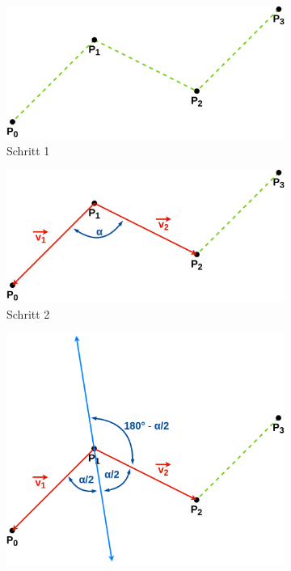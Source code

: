 \documentclass[doktyp=studarbeit]{TUBAFarbeiten}
\begin{document}
\begin{figure}[!htb]
    \centering
    \begin{subfigure}[b]{0.45\textwidth}
        \centering
        \includegraphics[width=1\linewidth]{Schlangenlinie-1.png}
        \caption{Schritt 1}
    \end{subfigure}
    \qquad
    \begin{subfigure}[b]{0.45\textwidth}
        \centering
        \includegraphics[width=1\linewidth]{Schlangenlinie-2.png}
        \caption{Schritt 2}
    \end{subfigure}
    \qquad
    \begin{subfigure}[b]{0.45\textwidth}
        \centering
        \includegraphics[width=1\linewidth]{Schlangenlinie-3.png}

\end{subfigure}
\end{figure}
\end{document}
